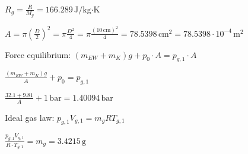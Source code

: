 \( R_g = \frac{R}{M_g} = 166.289 \, \text{J/kg·K} \)  

\( A = \pi \left( \frac{D}{2} \right)^2 = \pi \frac{D^2}{4} = \pi \frac{(10 \, \text{cm})^2}{4} = 78.5398 \, \text{cm}^2 = 78.5398 \cdot 10^{-4} \, \text{m}^2 \)  

Force equilibrium:  
\( (m_{EW} + m_K) g + p_0 \cdot A = p_{g,1} \cdot A \)  

\( \frac{(m_{EW} + m_K) g}{A} + p_0 = p_{g,1} \)  

\( \frac{32.1 + 9.81}{A} + 1 \, \text{bar} = 1.40094 \, \text{bar} \)  

Ideal gas law:  
\( p_{g,1} V_{g,1} = m_g R T_{g,1} \)  

\( \frac{p_{g,1} V_{g,1}}{R \cdot T_{g,1}} = m_g = 3.4215 \, \text{g} \)